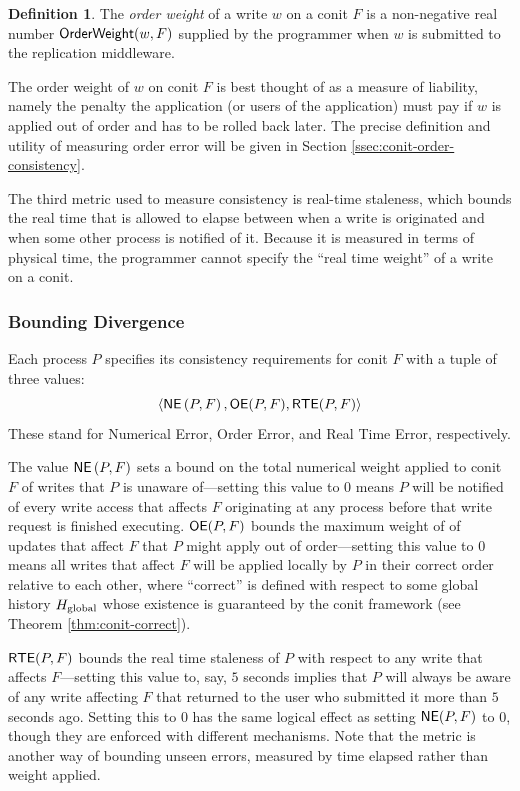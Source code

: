 \documentclass[]             %
{NASA}                       %
\theoremstyle{definition}
\newtheorem{definition}[theorem]{Definition}
\begin{document}
\begin{definition}
  The \emph{order weight} of a write $w$ on a conit $F$ is a
  non-negative real number $\mathsf{OrderWeight}(w, F)$ supplied by the
  programmer when $w$ is submitted to the replication middleware.
\end{definition}

The order weight of $w$ on conit $F$ is best thought of as a measure
of liability, namely the penalty the application (or users of the
application) must pay if $w$ is applied out of order and has to be
rolled back later. The precise definition and utility of measuring
order error will be given in Section
\ref{ssec:conit-order-consistency}.

The third metric used to measure consistency is real-time staleness,
which bounds the real time that is allowed to elapse between when a
write is originated and when some other process is notified of
it. Because it is measured in terms of physical time, the programmer
cannot specify the ``real time weight'' of a write on a conit.

\subsubsection{Bounding Divergence}
\label{ssec:conit-bounding-divergence}

Each process $P$ specifies its consistency requirements for conit $F$
with a tuple of three values:
\begin{equation*}
  \langle \mathsf{NE} \left(P, F\right), \mathsf{OE}(P, F), \mathsf{RTE}(P, F)\rangle
\end{equation*}
These stand for Numerical Error, Order Error, and Real Time Error,
respectively.

The value $\mathsf{NE}\left(P, F\right)$ sets a bound on the total numerical
weight applied to conit $F$ of writes that $P$ is unaware of---setting
this value to $0$ means $P$ will be notified of every write access
that affects $F$ originating at any process before that write request
is finished executing. $\mathsf{OE}(P, F)$ bounds the maximum weight of of
updates that affect $F$ that $P$ might apply out of order---setting
this value to $0$ means all writes that affect $F$ will be applied
locally by $P$ in their correct order relative to each other, where
``correct'' is defined with respect to some global history $H_\mathrm{global}$
whose existence is guaranteed by the conit framework (see Theorem
\ref{thm:conit-correct}).

$\mathsf{RTE}(P, F)$ bounds the real time staleness of $P$ with respect to any
write that affects $F$---setting this value to, say, $5$ seconds
implies that $P$ will always be aware of any write affecting $F$ that
returned to the user who submitted it more than $5$ seconds
ago. Setting this to $0$ has the same logical effect as setting
$\mathsf{NE}(P, F)$ to $0$, though they are enforced with different
mechanisms. Note that the metric is another way of bounding unseen
errors, measured by time elapsed rather than weight applied.
\end{document}
